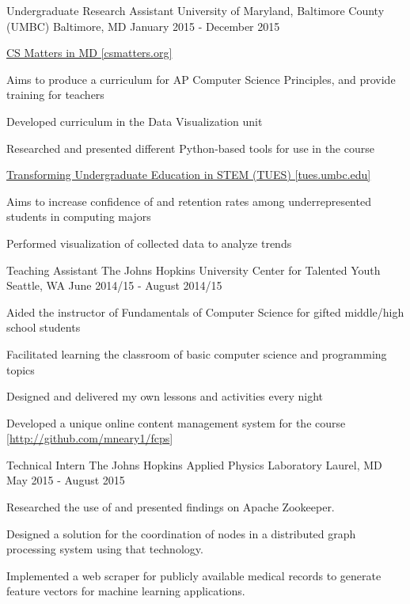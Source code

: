 \begin{cventries}
\cventry
{Undergraduate Research Assistant}
{University of Maryland, Baltimore County (UMBC)}
{Baltimore, MD}
{January 2015 - December 2015}
{
\begin{cvitems}
\item{\href{http://csmatters.org}{CS Matters in MD [csmatters.org]}}
\item{Aims to produce a curriculum for AP Computer Science Principles, and provide training for teachers}
\item{Developed curriculum in the Data Visualization unit}
\item{Researched and presented different Python-based tools for use in the course}
\item{\href{http://tues.umbc.edu}{Transforming Undergraduate Education in STEM (TUES) [tues.umbc.edu]}}
\item{Aims to increase confidence of and retention rates among underrepresented students in computing majors}
\item{Performed visualization of collected data to analyze trends}
\end{cvitems}
}
\cventry
{Teaching Assistant}
{The Johns Hopkins University Center for Talented Youth}
{Seattle, WA}
{June 2014/15 - August 2014/15}
{
    \begin{cvitems}
        \item{Aided the instructor of Fundamentals of Computer Science for gifted middle/high school students}
        \item{Facilitated learning the classroom of basic computer science and programming topics}
        \item{Designed and delivered my own lessons and activities every night}
        \item{Developed a unique online content management system for the course \href{http://github.com/mneary1/fcps}{[http://github.com/mneary1/fcps}]}
    \end{cvitems}
}

\cventry
{Technical Intern}
{The Johns Hopkins Applied Physics Laboratory}
{Laurel, MD}
{May 2015 - August 2015}
{
    \begin{cvitems}
        \item{Researched the use of and presented findings on Apache Zookeeper.}
        \item{Designed a solution for the coordination of nodes in a distributed graph processing system using that technology.}
        \item{Implemented a web scraper for publicly available medical records to generate feature vectors for machine learning applications.}
    \end{cvitems}
}


\end{cventries}
